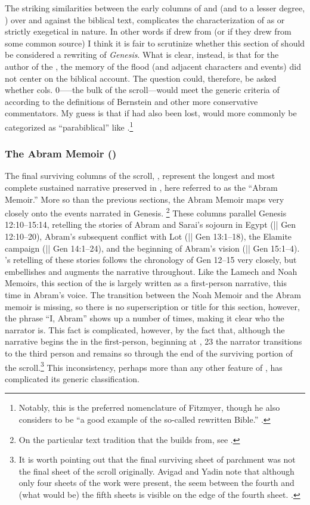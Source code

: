The striking similarities between the early columns of \ga and \jub (and to a lesser degree, \firstenoch) over and against the biblical text, complicates the characterization of \ga as \rwb or strictly exegetical in nature. In other words if \ga drew from \jub (or if they drew from some common source) I think it is fair to scrutinize whether this section of \ga should be considered a rewriting of \emph{Genesis}. What is clear, instead, is that for the author of the \ga, the memory of the flood (and adjacent characters and events) did not center on the biblical account. The question could, therefore, be asked whether cols. 0-----the bulk of the scroll---would meet the generic criteria of \rwb according to the definitions of Bernstein and other more conservative commentators. My guess is that if  had also been lost, \ga would more commonly be categorized as ``parabiblical'' like \firstenoch.\footnote{Notably, this is the preferred nomenclature of Fitzmyer, though he also considers \ga to be ``a good example of the so-called rewritten Bible.'' \cite[20]{fitzmyer2004}.}

\subsubsection{The Abram Memoir ()}

The final surviving columns of the scroll, , represent the longest and most complete sustained narrative preserved in \ga, here referred to as the ``Abram Memoir.'' More so than the previous sections, the Abram Memoir maps very closely onto the events narrated in Genesis.%
%
\footnote{On the particular text tradition that the \ga builds from, see \cite{vanderkam1978}.}%
%
These columns parallel Genesis 12:10--15:14, retelling the stories of Abram and Sarai's sojourn in Egypt (|| Gen 12:10--20), Abram's subsequent conflict with Lot (|| Gen 13:1--18), the Elamite campaign (|| Gen 14:1--24), and the beginning of Abram's vision (|| Gen 15:1--4). \ga's retelling of these stories follows the chronology of Gen 12--15 very closely, but embellishes and augments the narrative throughout. Like the Lamech and Noah Memoirs, this section of the \ga is largely written as a first-person narrative, this time in Abram's voice. The transition between the Noah Memoir and the Abram memoir is missing, so there is no superscription or title for this section, however, the phrase ``I, Abram'' shows up a number of times, making it clear who the narrator is. This fact is complicated, however, by the fact that, although the narrative begins the in the first-person, beginning at , 23 the narrator transitions to the third person and remains so through the end of the surviving portion of the scroll.\footnote{It is worth pointing out that the final surviving sheet of parchment was not the final sheet of the scroll originally. Avigad and Yadin note that although only four sheets of the work were present, the seem between the fourth and (what would be) the fifth sheets is visible on the edge of the fourth sheet. \cite*[14]{avigad-yadin1956}.} This inconsistency, perhaps more than any other feature of \ga, has complicated its generic classification.

